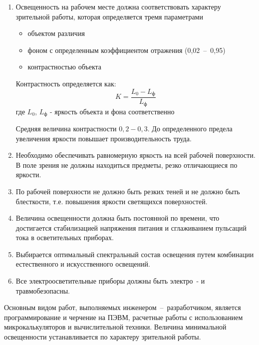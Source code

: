 \begin{enumerate}
    \item   Освещенность на рабочем месте должна соответствовать характеру
            зрительной работы, которая определяется тремя параметрами
        \begin{itemize}
            \item объектом различия
            \item фоном с определенным коэффициентом отражения (0,02~--~0,95)
            \item контрастностью объекта
        \end{itemize}
    Контрастность определяется как:
    \begin{equation}
    \label{lighting_contrast}
        K = \frac{L_0 - L_\text{ф}}{L_\text{ф}}
    \end{equation}
    где $L_0$, $L_\text{ф}$ - яркость объекта и фона соответственно

    Средняя величина контрастности $0,2 - 0,3$. До определенного предела увеличения
    яркости повышает производительность труда.

    \item   Необходимо обеспечивать равномерную яркость на всей рабочей поверхности.
            В поле зрения не должны находиться предметы, резко отличающиеся по яркости.

    \item   По рабочей поверхности не должно быть резких теней и не должно быть
            блесткости, т.е. повышения яркости светящихся поверхностей.

    \item   Величина освещенности должна быть постоянной по времени, что достигается
            стабилизацией напряжения питания и сглаживанием пульсаций тока в
            осветительных приборах.

    \item   Выбирается оптимальный спектральный состав освещения путем комбинации
            естественного и искусственного освещений.

    \item   Все электроосветительные приборы должны быть электро~- и травмобезопасны.
\end{enumerate}

Основным видом работ, выполняемых инженером~--~разработчиком, является программирование
и черчение на ПЭВМ, расчетные работы с использованием микрокалькуляторов и вычислительной
техники. Величина минимальной освещенности устанавливается по характеру зрительной работы.

